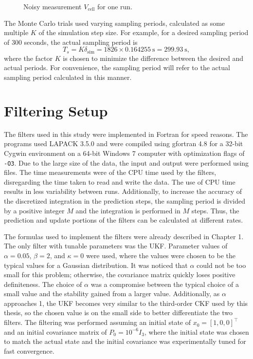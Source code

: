 \documentclass[../zhang_thesis.tex]{subfiles}
\begin{document}
\begin{figure}[htb]
\centering

\caption{Noisy measurement $V_\text{cell}$ for one run.}
\label{fig:meas}
\end{figure}

The Monte Carlo trials used varying sampling periods, calculated as some multiple $K$ of the simulation step size. For example, for a desired sampling period of 300 seconds, the actual sampling period is
\begin{equation}
    T_s = K \delta_\text{sim} = 1826 \times 0.164255~\text{s} = 299.93~\text{s},
\end{equation}
where the factor $K$ is chosen to minimize the difference between the desired and actual periods. For convenience, the sampling period will refer to the actual sampling period calculated in this manner.

\section{Filtering Setup}

The filters used in this study were implemented in Fortran for speed reasons. The programs used LAPACK 3.5.0 and were compiled using gfortran 4.8 for a 32-bit Cygwin environment on a 64-bit Windows 7 computer with optimization flags of \texttt{-O3}. Due to the large size of the data, the input and output were performed using files. The time measurements were of the CPU time used by the filters, disregarding the time taken to read and write the data. The use of CPU time results in less
variability between runs. Additionally, to increase the accuracy of the discretized integration in the prediction steps, the sampling period is divided by a positive integer $M$ and the integration is performed in $M$ steps. Thus, the prediction and update portions of the filters can be calculated at different rates.

The formulas used to implement the filters were already described in Chapter 1. The only filter with tunable parameters was the UKF. Parameter values of $\alpha=0.05$, $\beta=2$, and $\kappa=0$ were used, where the values were chosen to be the typical values for a Gaussian distribution. It was noticed that $\alpha$ could not be too small for this problem; otherwise, the covariance matrix quickly loses positive definiteness. The choice of $\alpha$ was a compromise between the typical
choice of a small value and the stability gained from a larger value. Additionally, as $\alpha$ approaches 1, the UKF becomes very similar to the third-order CKF used by this thesis, so the chosen value is on the small side to better differentiate the two filters. The filtering was performed assuming an initial state of $x_0=[1,0,0]^\top$ and an initial covariance matrix of $P_0=10^{-6} I_3$, where the initial state was chosen to match the actual state and the initial covariance was experimentally tuned for fast convergence. 
\end{document}
